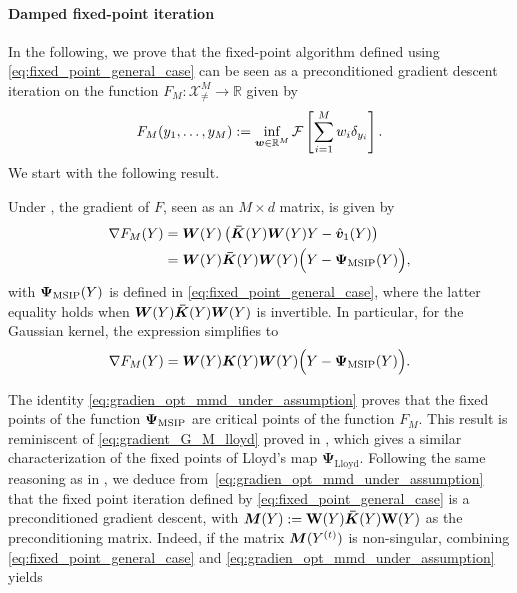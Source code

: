 \paragraph{Damped fixed-point iteration}
In the following, we prove that the fixed-point algorithm defined using \eqref{eq:fixed_point_general_case} can be seen as a preconditioned gradient descent iteration on the function 
$F_M: \mathcal{X}_{\neq}^{M} \rightarrow \mathbb{R}$ given by
\begin{equation}\label{eq:opt_mmd_functional}
        F_{M}(y_{1}, \dots, y_{M}) := \inf\limits_{\bm{w} \in \mathbb{R}^{M}} \mathcal{F} \left[ \sum\limits_{i=1}^{M}w_{i} \delta_{y_{i}} \right].
    \end{equation}
We start with the following result.
\begin{theorem}\label{thm:gradient_opt_mmd}
    Under , the gradient of $F$, seen as an $M \times d$ matrix, is given by 
\begin{align}\label{eq:gradien_opt_mmd_under_assumption}
\nabla F_{M}(Y) & =  \bm{W}(Y)\left(\bm{\bar{K}}(Y)\bm{W}(Y)Y - \hat{\bm{v}}_1(Y) \right)\\
&= \bm{W}(Y) \bm{\bar{K}}(Y) \bm{W}(Y) \Big( Y - \bm{\Psi}_{\mathrm{MSIP}}(Y) \Big), \nonumber
\end{align}
with $\bm{\Psi}_{\mathrm{MSIP}}(Y)$ is defined in \eqref{eq:fixed_point_general_case}, where the latter equality holds when $\bm{W}(Y)\bm{\bar{K}}(Y)\bm{W}(Y)$ is invertible.
In particular, for the Gaussian kernel, the expression simplifies to 
\begin{equation*}\label{eq:gradien_opt_mmd_gaussian_kernel}
  \nabla F_{M}(Y) =  \bm{W}(Y) \bm{K}(Y) \bm{W}(Y) \Big( Y - \bm{\Psi}_{\mathrm{MSIP}}(Y) \Big).
\end{equation*}
\end{theorem}
The identity \eqref{eq:gradien_opt_mmd_under_assumption} proves that the fixed points of the function $\bm{\Psi}_{\mathrm{MSIP}}$ are critical points of the function $F_M$. This result is reminiscent of \eqref{eq:gradient_G_M_lloyd} proved in \cite{DuFaGu99}, which gives a similar characterization of the fixed points of Lloyd's map $\bm{\Psi}_{\mathrm{Lloyd}}$. Following the same reasoning as in \cite{PoCaPa24}, 
we deduce from~\eqref{eq:gradien_opt_mmd_under_assumption} that the fixed point iteration defined by \eqref{eq:fixed_point_general_case} is a preconditioned gradient descent, with $\bm{M}(Y):=  \mathbf{W}(Y) \bm{\bar{K}}(Y) \mathbf{W}(Y)$ as the preconditioning matrix.
 Indeed, if the matrix $\bm{M}(Y^{(t)})$ is non-singular, combining \eqref{eq:fixed_point_general_case} and \eqref{eq:gradien_opt_mmd_under_assumption} yields
